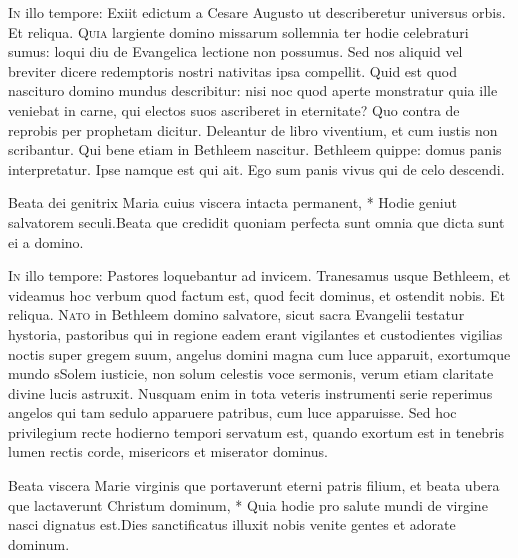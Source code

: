 \begin{multicols*}{2}
\lettrine[lines=2]{\zallmancaps \color{Blue} I}{n} illo tempore: Exiit edictum a Cesare Augusto ut describeretur universus orbis. Et reliqua.
\lettrine[lines=2]{\zallmancaps \color{Red} Q}{uia} largiente domino missarum sollemnia ter hodie celebraturi sumus: loqui diu de Evangelica lectione non possumus. Sed nos aliquid vel breviter dicere redemptoris nostri nativitas ipsa compellit. Quid est quod nascituro domino mundus describitur: nisi noc quod aperte monstratur quia ille veniebat in carne, qui electos suos ascriberet in eternitate? Quo contra de reprobis per prophetam dicitur. Deleantur de libro viventium, et cum iustis non scribantur. Qui bene etiam in Bethleem nascitur. Bethleem quippe: domus panis interpretatur. Ipse namque est qui ait. Ego sum panis vivus qui de celo descendi.
\begin{responsory}
{Beata dei genitrix Maria cuius viscera intacta permanent, * Hodie geniut salvatorem seculi.}{Beata que credidit quoniam perfecta sunt omnia que dicta sunt ei a domino.}
\end{responsory}
\lettrine[lines=2]{\zallmancaps \color{Blue} I}{n} illo tempore: Pastores loquebantur ad invicem. Tranesamus usque Bethleem, et videamus hoc verbum quod factum est, quod fecit dominus, et ostendit nobis. Et reliqua.
\lettrine[lines=2]{\zallmancaps \color{Red} N}{ato} in Bethleem domino salvatore, sicut sacra Evangelii testatur hystoria, pastoribus qui in regione eadem erant vigilantes et custodientes vigilias noctis super gregem suum, angelus domini magna cum luce apparuit, exortumque mundo sSolem iusticie, non solum celestis voce sermonis, verum etiam claritate divine lucis astruxit. Nusquam enim in tota veteris instrumenti serie reperimus angelos qui tam sedulo apparuere patribus, cum luce apparuisse. Sed hoc privilegium recte hodierno tempori servatum est, quando exortum est in tenebris lumen rectis corde, misericors et miserator dominus.
\begin{responsory}
{Beata viscera Marie virginis que portaverunt eterni patris filium, et beata ubera que lactaverunt Christum dominum, * Quia hodie pro salute mundi de virgine nasci dignatus est.}{Dies sanctificatus illuxit nobis venite gentes et adorate dominum.}

\end{responsory}
\end{multicols*}
